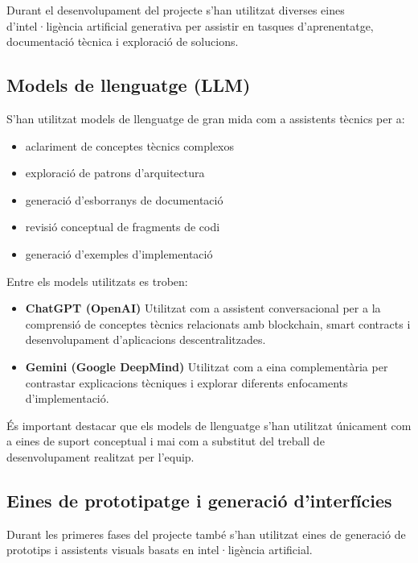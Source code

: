 Durant el desenvolupament del projecte s’han utilitzat diverses eines d’intel·ligència artificial generativa per assistir en tasques d’aprenentatge, documentació tècnica i exploració de solucions.

\subsection{Models de llenguatge (LLM)}

S’han utilitzat models de llenguatge de gran mida com a assistents tècnics per a:

\begin{itemize}

\item aclariment de conceptes tècnics complexos
\item exploració de patrons d’arquitectura
\item generació d’esborranys de documentació
\item revisió conceptual de fragments de codi
\item generació d’exemples d’implementació

\end{itemize}

Entre els models utilitzats es troben:

\begin{itemize}

\item \textbf{ChatGPT (OpenAI)}  
Utilitzat com a assistent conversacional per a la comprensió de conceptes tècnics relacionats amb blockchain, smart contracts i desenvolupament d’aplicacions descentralitzades.

\item \textbf{Gemini (Google DeepMind)}  
Utilitzat com a eina complementària per contrastar explicacions tècniques i explorar diferents enfocaments d’implementació.

\end{itemize}

És important destacar que els models de llenguatge s’han utilitzat únicament com a eines de suport conceptual i mai com a substitut del treball de desenvolupament realitzat per l’equip.

\subsection{Eines de prototipatge i generació d’interfícies}

Durant les primeres fases del projecte també s’han utilitzat eines de generació de prototips i assistents visuals basats en intel·ligència artificial.


